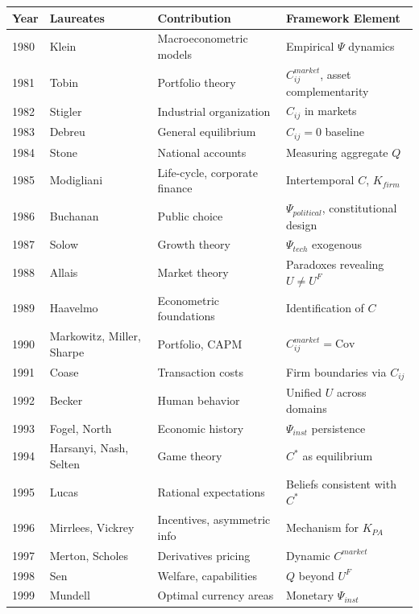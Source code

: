 \begin{center}
\renewcommand{\arraystretch}{1.15}
\small
\begin{tabular}{llll}
\hline
\textbf{Year} & \textbf{Laureates} & \textbf{Contribution} & \textbf{Framework Element} \\
\hline
1980 & Klein & Macroeconometric models & Empirical $\Psi$ dynamics \\
1981 & Tobin & Portfolio theory & $C^{market}_{ij}$, asset complementarity \\
1982 & Stigler & Industrial organization & $C_{ij}$ in markets \\
1983 & Debreu & General equilibrium & $C_{ij} = 0$ baseline \\
1984 & Stone & National accounts & Measuring aggregate $Q$ \\
1985 & Modigliani & Life-cycle, corporate finance & Intertemporal $C$, $K_{firm}$ \\
1986 & Buchanan & Public choice & $\Psi_{political}$, constitutional design \\
1987 & Solow & Growth theory & $\Psi_{tech}$ exogenous \\
1988 & Allais & Market theory & Paradoxes revealing $U \neq U^F$ \\
1989 & Haavelmo & Econometric foundations & Identification of $C$ \\
1990 & Markowitz, Miller, Sharpe & Portfolio, CAPM & $C^{market}_{ij} = \text{Cov}$ \\
1991 & Coase & Transaction costs & Firm boundaries via $C_{ij}$ \\
1992 & Becker & Human behavior & Unified $U$ across domains \\
1993 & Fogel, North & Economic history & $\Psi_{inst}$ persistence \\
1994 & Harsanyi, Nash, Selten & Game theory & $C^*$ as equilibrium \\
1995 & Lucas & Rational expectations & Beliefs consistent with $C^*$ \\
1996 & Mirrlees, Vickrey & Incentives, asymmetric info & Mechanism for $K_{PA}$ \\
1997 & Merton, Scholes & Derivatives pricing & Dynamic $C^{market}$ \\
1998 & Sen & Welfare, capabilities & $Q$ beyond $U^F$ \\
1999 & Mundell & Optimal currency areas & Monetary $\Psi_{inst}$ \\
\hline
\end{tabular}
\end{center}

